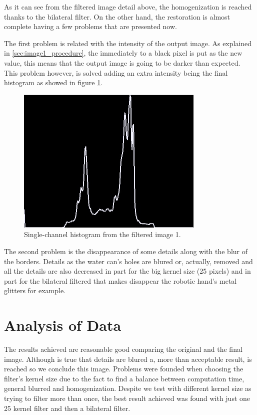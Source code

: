 As it can see from the filtered image detail above, the homogenization is reached thanks to the bilateral filter. On the other hand, the restoration is almost complete having a few problems that are presented now.

The first problem is related with the intensity of the output image. As explained in \ref{sec:image1_procedure}, the immediately to a black pixel is put as the new value, this means that the output image is going to be darker than expected. This problem however, is solved adding an extra intensity being the final histogram as showed in figure \ref{fig:1-histogramFiltered}.

\begin{figure}[!ht]
	\centering
	\includegraphics[width=0.8\textwidth]{figures/1-histogramFiltered}
	\caption{Single-channel histogram from the filtered image 1.}
	\label{fig:1-histogramFiltered}
\end{figure}

The second problem is the disappearance of some details along with the blur of the borders. Details as the water can's holes are blured or, actually, removed and all the details are also decreased in part for the big kernel size (25 pixels) and in part for the bilateral filtered that makes disappear the robotic hand's metal glitters for example. 

\section{Analysis of Data}
\label{sec:image1_analysis}
The results achieved are reasonable good comparing the original and the final image. Although is true that details are blured a, more than acceptable result, is reached so we conclude this image. Problems were founded when choosing the filter's kernel size due to the fact to find a balance between computation time, general blurred and homogenization. Despite we test with different kernel size as trying to filter more than once, the best result achieved was found with just one 25 kernel filter and then a bilateral filter.

